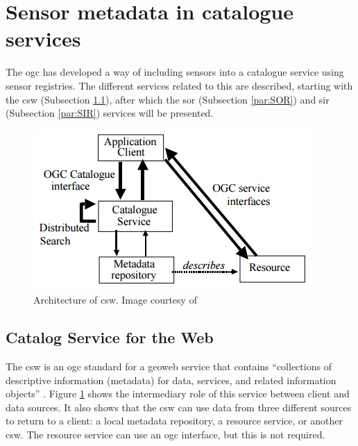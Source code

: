 \section{Sensor metadata in catalogue services}
\label{par:catalogService}
The \ac{ogc} has developed a way of including sensors into a catalogue service using sensor registries. The different services related to this are described, starting with the \acf{csw} (Subsection \ref{par:CSW}), after which the \acf{sor} (Subsection \ref{par:SOR}) and \acf{sir} (Subsection \ref{par:SIR}) services will be presented.

\begin{figure}
	\centering
	\includegraphics[width=0.6\linewidth]{UML/CSW.png}
	\caption{Architecture of \acl*{csw}. Image courtesy of \cite[p. 26]{GEO:OGC2}}
	\label{fig:CSW}
\end{figure}

\subsection{Catalog Service for the Web}
\label{par:CSW}
The \ac{csw} is an \ac{ogc} standard for a geoweb service that contains \enquote{collections of descriptive information (metadata) for data, services, and related information objects} \citep[p. xiv]{GEO:OGC2}. Figure \ref{fig:CSW} shows the intermediary role of this service between client and data sources. It also shows that the \ac{csw} can use data from three different sources to return to a client: a local metadata repository, a resource service, or another \ac{csw}. The resource service can use an \ac{ogc} interface, but this is not required. 

